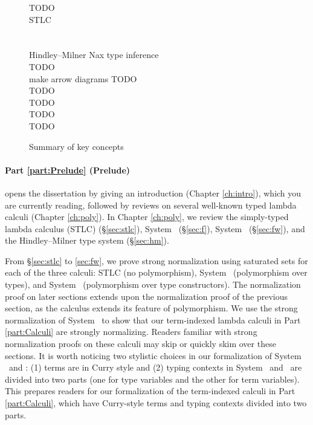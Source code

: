 \begin{figure}
TODO \\

STLC\\
\F\
\Fw\    \Fi\ \\
\Fixw\  \Fixi\ \\
Hindley--Milner Nax type inference \\

TODO \\
make arrow diagrams
TODO \\
TODO \\
TODO \\
TODO \\
TODO \\
\caption{Summary of key concepts}
\label{fig:overview}
\end{figure}

\paragraph{Part \ref{part:Prelude} (Prelude)}\hspace{-1em} opens
the dissertation by giving an introduction (Chapter \ref{ch:intro}),
which you are currently reading, followed by
reviews on several well-known typed lambda calculi (Chapter \ref{ch:poly}).
In Chapter \ref{ch:poly}, we review
the simply-typed lambda calculus (STLC) (\S\ref{sec:stlc}),
System \F\ (\S\ref{sec:f}),
System \Fw\ (\S\ref{sec:fw}), and
the Hindley--Milner type system (\S\ref{sec:hm}).

From \S\ref{sec:stlc} to \ref{sec:fw}, we prove strong normalization using
saturated sets for each of the three calculi:
STLC (no polymorphism), System \F\ (polymorphism over types), and
System \Fw\ (polymorphism over type constructors).
The normalization proof on later sections extends upon
the normalization proof of the previous section,
as the calculus extends its feature of polymorphism.
We use the strong normalization of System \Fw\ to show that
our term-indexed lambda calculi in Part \ref{part:Calculi} are
strongly normalizing. Readers familiar with strong normalization proofs
on these calculi may skip or quickly skim over these sections.
It is worth noticing two stylistic choices in our formalization of
System \F\ and \Fw: (1) terms are in Curry style and
(2) typing contexts in System \F\ and \Fw\ are divided into two parts
    (one for type variables and the other for term variables).
This prepares readers for our formalization of the term-indexed calculi
in Part \ref{part:Calculi}, which have Curry-style terms and
typing contexts divided into two parts.

